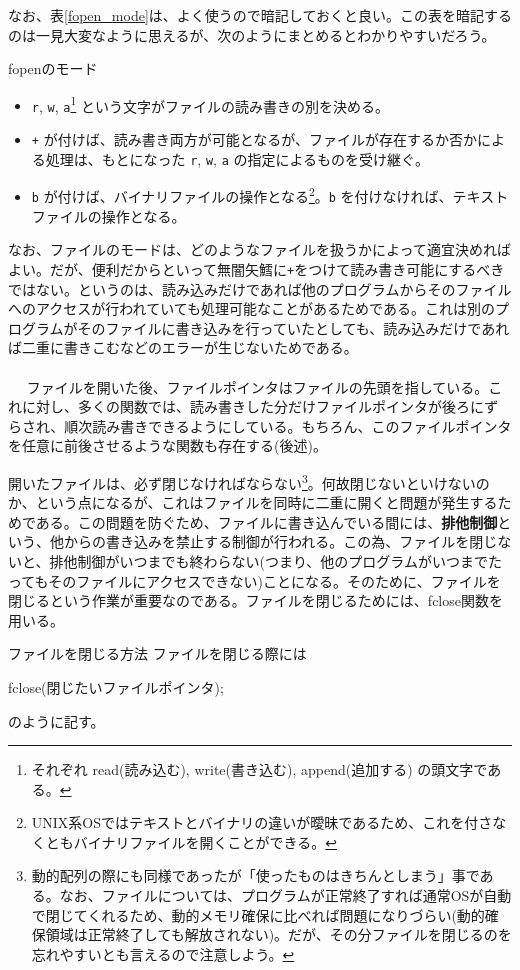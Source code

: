 なお、表\ref{fopen_mode}は、よく使うので暗記しておくと良い。この表を暗記するのは一見大変なように思えるが、次のようにまとめるとわかりやすいだろう。
\begin{itembox}[l]{fopenのモード}
\begin{itemize}
 \item \verb|r|, \verb|w|, \verb|a|\footnote{それぞれ read(読み込む), write(書き込む), append(追加する) の頭文字である。} という文字がファイルの読み書きの別を決める。
 \item \verb|+| が付けば、読み書き両方が可能となるが、ファイルが存在するか否かによる処理は、もとになった \verb|r|, \verb|w|, \verb|a| の指定によるものを受け継ぐ。
 \item \verb|b| が付けば、バイナリファイルの操作となる\footnote{UNIX系OSではテキストとバイナリの違いが曖昧であるため、これを付さなくともバイナリファイルを開くことができる。}。\verb|b| を付けなければ、テキストファイルの操作となる。
\end{itemize}
\end{itembox}

なお、ファイルのモードは、どのようなファイルを扱うかによって適宜決めればよい。だが、便利だからといって無闇矢鱈に\verb|+|をつけて読み書き可能にするべきではない。というのは、読み込みだけであれば他のプログラムからそのファイルへのアクセスが行われていても処理可能なことがあるためである。これは別のプログラムがそのファイルに書き込みを行っていたとしても、読み込みだけであれば二重に書きこむなどのエラーが生じないためである。
\\ \\　
ファイルを開いた後、ファイルポインタはファイルの先頭を指している。これに対し、多くの関数では、読み書きした分だけファイルポインタが後ろにずらされ、順次読み書きできるようにしている。もちろん、このファイルポインタを任意に前後させるような関数も存在する(後述)。

開いたファイルは、必ず閉じなければならない\footnote{動的配列の際にも同様であったが「使ったものはきちんとしまう」事である。なお、ファイルについては、プログラムが正常終了すれば通常OSが自動で閉じてくれるため、動的メモリ確保に比べれば問題になりづらい(動的確保領域は正常終了しても解放されない)。だが、その分ファイルを閉じるのを忘れやすいとも言えるので注意しよう。}。何故閉じないといけないのか、という点になるが、これはファイルを同時に二重に開くと問題が発生するためである。この問題を防ぐため、ファイルに書き込んでいる間には、\textbf{排他制御}という、他からの書き込みを禁止する制御が行われる。この為、ファイルを閉じないと、排他制御がいつまでも終わらない(つまり、他のプログラムがいつまでたってもそのファイルにアクセスできない)ことになる。そのために、ファイルを閉じるという作業が重要なのである。ファイルを閉じるためには、fclose関数を用いる。
\begin{itembox}[l]{ファイルを閉じる方法}
ファイルを閉じる際には
\begin{code}
fclose(閉じたいファイルポインタ); 
\end{code}
のように記す。
\end{itembox}


